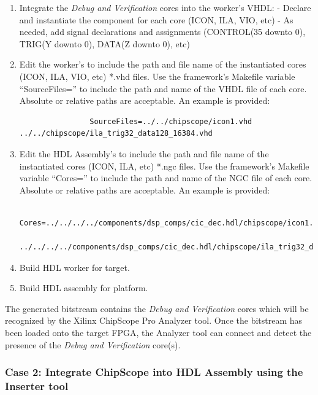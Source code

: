 \begin{flushleft}
		\begin{enumerate}
			\item Integrate the \textit{Debug and Verification} cores into the worker's VHDL:
				\subitem - Declare and instantiate the component for each core (ICON, ILA, VIO, etc)
				\subitem - As needed, add signal declarations and assignments (CONTROL(35 downto 0), TRIG(Y downto 0), DATA(Z downto 0), etc)
			\item Edit the worker's  to include the path and file name of the
			instantiated cores (ICON, ILA, VIO, etc) *.vhd files. Use the framework's Makefile
			variable ``SourceFiles='' to include the path and name of the VHDL file of each core.
			Absolute or relative paths are acceptable. An example is provided:
			\small\begin{verbatim}
				SourceFiles=../../chipscope/icon1.vhd ../../chipscope/ila_trig32_data128_16384.vhd
			\end{verbatim}
		 	\item Edit the HDL Assembly's  to include the path and file name of
		 	the	instantiated cores (ICON, ILA, etc) *.ngc files. Use the framework's
		 	Makefile variable ``Cores='' to include the path and name of the NGC file of each
		 	core. Absolute or relative paths are acceptable. An example is provided:
		 	\small\begin{verbatim}
		 		Cores=../../../../components/dsp_comps/cic_dec.hdl/chipscope/icon1.ngc
		 		../../../../components/dsp_comps/cic_dec.hdl/chipscope/ila_trig32_data128_16384.ngc
		 	\end{verbatim}
		 	\item Build HDL worker for target.
			\item Build HDL assembly for platform.
		\end{enumerate}

		The generated bitstream contains the \textit{Debug and Verification} cores which will be recognized by the Xilinx ChipScope Pro Analyzer tool. Once the bitstream has been loaded onto the target FPGA, the Analyzer tool can connect and detect the presence of the \textit{Debug and Verification} core(s).

	\newpage

	\subsubsection{Case 2: Integrate ChipScope into HDL Assembly using the Inserter tool}


\end{flushleft}
